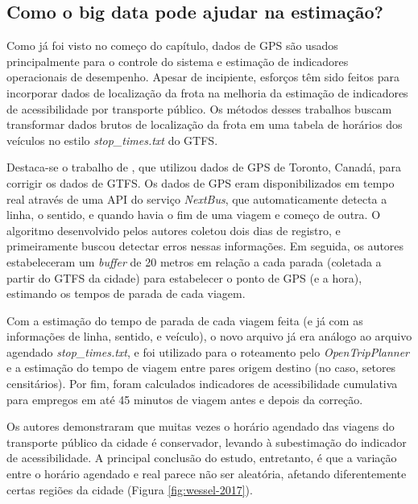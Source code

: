 \documentclass[        
    a4paper,          %
    12pt,             %
    chapter=TITLE,    %
    section=Title,    %
    subsection=Title, %
    oneside,          %
    english,          %
    spanish,          %
    brazil,           %
    fleqn             %
]{abntex2}
\begin{document}
  \hypertarget{como-o-big-data-pode-ajudar-na-estimacao}{%
  \subsection{Como o big data pode ajudar na estimação?}\label{como-o-big-data-pode-ajudar-na-estimacao}}
  
  Como já foi visto no começo do capítulo, dados de GPS são usados principalmente para o controle do sistema e estimação de indicadores operacionais de desempenho. Apesar de incipiente, esforços têm sido feitos para incorporar dados de localização da frota na melhoria da estimação de indicadores de acessibilidade por transporte público. Os métodos desses trabalhos buscam transformar dados brutos de localização da frota em uma tabela de horários dos veículos no estilo \emph{stop\_times.txt} do GTFS.
  
  Destaca-se o trabalho de \citet{Wessel2017}, que utilizou dados de GPS de Toronto, Canadá, para corrigir os dados de GTFS. Os dados de GPS eram disponibilizados em tempo real através de uma API do serviço \emph{NextBus}, que automaticamente detecta a linha, o sentido, e quando havia o fim de uma viagem e começo de outra. O algoritmo desenvolvido pelos autores coletou dois dias de registro, e primeiramente buscou detectar erros nessas informações. Em seguida, os autores estabeleceram um \emph{buffer} de 20 metros em relação a cada parada (coletada a partir do GTFS da cidade) para estabelecer o ponto de GPS (e a hora), estimando os tempos de parada de cada viagem.
  
  Com a estimação do tempo de parada de cada viagem feita (e já com as informações de linha, sentido, e veículo), o novo arquivo já era análogo ao arquivo agendado \emph{stop\_times.txt}, e foi utilizado para o roteamento pelo \emph{OpenTripPlanner} e a estimação do tempo de viagem entre pares origem destino (no caso, setores censitários). Por fim, foram calculados indicadores de acessibilidade cumulativa para empregos em até 45 minutos de viagem antes e depois da correção.
  
  Os autores demonstraram que muitas vezes o horário agendado das viagens do transporte público da cidade é conservador, levando à subestimação do indicador de acessibilidade. A principal conclusão do estudo, entretanto, é que a variação entre o horário agendado e real parece não ser aleatória, afetando diferentemente certas regiões da cidade (Figura \ref{fig:wessel-2017}).
  
\end{document}

